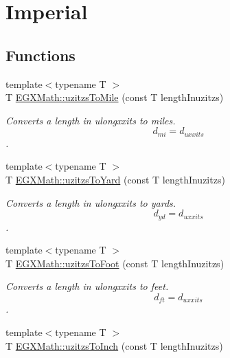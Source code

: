 \hypertarget{group___e_g_x_math-_conversions-_length_conversions-uzitzs-_imperial}{}\section{Imperial}
\label{group___e_g_x_math-_conversions-_length_conversions-uzitzs-_imperial}
\subsection*{Functions}
\begin{DoxyCompactItemize}
\item 
{\footnotesize template$<$typename T $>$ }\\T \mbox{\hyperlink{group___e_g_x_math-_conversions-_length_conversions-uzitzs-_imperial_ga3396c913e6937eee49337db8fac05ca7}{E\+G\+X\+Math\+::uzitzs\+To\+Mile}} (const T length\+Inuzitzs)
\begin{DoxyCompactList}\small\item\em Converts a length in ulongxxits to miles. \[ d_{mi}=d_{uxxits} \]. \end{DoxyCompactList}\item 
{\footnotesize template$<$typename T $>$ }\\T \mbox{\hyperlink{group___e_g_x_math-_conversions-_length_conversions-uzitzs-_imperial_ga3281bb64c81bc68a166a47ccc1f9a146}{E\+G\+X\+Math\+::uzitzs\+To\+Yard}} (const T length\+Inuzitzs)
\begin{DoxyCompactList}\small\item\em Converts a length in ulongxxits to yards. \[ d_{yd}=d_{uxxits} \]. \end{DoxyCompactList}\item 
{\footnotesize template$<$typename T $>$ }\\T \mbox{\hyperlink{group___e_g_x_math-_conversions-_length_conversions-uzitzs-_imperial_gaafdc16c327535a3ea42909a5ebadac71}{E\+G\+X\+Math\+::uzitzs\+To\+Foot}} (const T length\+Inuzitzs)
\begin{DoxyCompactList}\small\item\em Converts a length in ulongxxits to feet. \[ d_{ft}=d_{uxxits} \]. \end{DoxyCompactList}\item 
{\footnotesize template$<$typename T $>$ }\\T \mbox{\hyperlink{group___e_g_x_math-_conversions-_length_conversions-uzitzs-_imperial_gad471f5c0b894eb0f2850a19347306ed4}{E\+G\+X\+Math\+::uzitzs\+To\+Inch}} (const T length\+Inuzitzs)

\end{DoxyCompactItemize}
